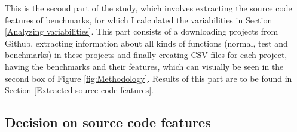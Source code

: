 \documentclass{seal_thesis}
\begin{document}
This is the second part of the study, which involves extracting the source code features of benchmarks, for which I calculated the variabilities in Section \ref{Analyzing variabilities}. This part consists of a downloading projects from Github, extracting information about all kinds of functions (normal, test and benchmarks) in these projects and finally creating CSV files for each project, having the benchmarks and their features, which can visually be seen in the second box of Figure \ref{fig:Methodology}. Results of this part are to be found in Section \ref{Extracted source code features}.

\subsection{Decision on source code features}
\end{document}
